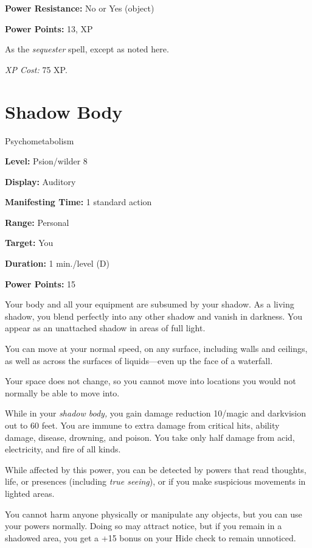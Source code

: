 \documentclass{article}
\begin{document}
\textbf{Power Resistance:} No or Yes (object)

\textbf{Power Points:} 13, XP

As the \textit{sequester }spell, except as noted here. 

\textit{XP Cost: }75 XP.

\vspace{12pt}
\section*{Shadow Body}

Psychometabolism

\textbf{Level:} Psion/wilder 8

\textbf{Display:} Auditory

\textbf{Manifesting Time:} 1 standard action

\textbf{Range:} Personal

\textbf{Target:} You

\textbf{Duration:} 1 min./level (D)

\textbf{Power Points:} 15

Your body and all your equipment are subsumed by your shadow. As a living shadow, 
you blend perfectly into any other shadow and vanish in darkness. You appear as 
an unattached shadow in areas of full light.

You can move at your normal speed, on any surface, including walls and ceilings, 
as well as across the surfaces of liquids---even up the face of a waterfall.

Your space does not change, so you cannot move into locations you would not normally 
be able to move into.

While in your \textit{shadow body, }you gain damage reduction 10/magic and darkvision 
out to 60 feet. You are immune to extra damage from critical hits, ability damage, 
disease, drowning, and poison. You take only half damage from acid, electricity, 
and fire of all kinds.

While affected by this power, you can be detected by powers that read thoughts, 
life, or presences (including \textit{true seeing}), or if you make suspicious 
movements in lighted areas.

You cannot harm anyone physically or manipulate any objects, but you can use your 
powers normally. Doing so may attract notice, but if you remain in a shadowed area, 
you get a +15 bonus on your Hide check to remain unnoticed.

\vspace{12pt}
\end{document}

